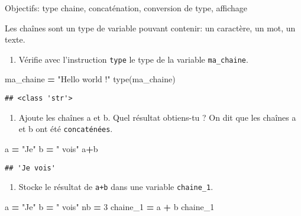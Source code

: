 \documentclass[
]{book}
\newenvironment{Shaded}{\begin{snugshade}}{\end{snugshade}}
\newcommand{\BuiltInTok}[1]{#1}
\newcommand{\DecValTok}[1]{\textcolor[rgb]{0.00,0.00,0.81}{#1}}
\newcommand{\NormalTok}[1]{#1}
\newcommand{\OperatorTok}[1]{\textcolor[rgb]{0.81,0.36,0.00}{\textbf{#1}}}
\newcommand{\StringTok}[1]{\textcolor[rgb]{0.31,0.60,0.02}{#1}}
\providecommand{\tightlist}{%
  \setlength{\itemsep}{0pt}\setlength{\parskip}{0pt}}
\def\tightlist{}
\begin{document}
Objectifs: type chaine, concaténation, conversion de type, affichage

Les chaînes sont un type de variable pouvant contenir: un caractère, un mot, un texte.

\begin{enumerate}
\def\labelenumi{\arabic{enumi}.}
\tightlist
\item
  Vérifie avec l'instruction \texttt{type} le type de la variable \texttt{ma\_chaine}.
\end{enumerate}

\begin{Shaded}
\begin{Highlighting}[]
\NormalTok{ma\_chaine }\OperatorTok{=} \StringTok{"Hello world !"}
\BuiltInTok{type}\NormalTok{(ma\_chaine)}
\end{Highlighting}
\end{Shaded}

\begin{verbatim}
## <class 'str'>
\end{verbatim}

\begin{enumerate}
\def\labelenumi{\arabic{enumi}.}
\setcounter{enumi}{1}
\tightlist
\item
  Ajoute les chaînes a et b. Quel résultat obtiens-tu ? On dit que les chaînes a et b ont été \texttt{concaténées}.
\end{enumerate}

\begin{Shaded}
\begin{Highlighting}[]
\NormalTok{a }\OperatorTok{=} \StringTok{"Je"}
\NormalTok{b }\OperatorTok{=} \StringTok{" vois"}
\NormalTok{a}\OperatorTok{+}\NormalTok{b}
\end{Highlighting}
\end{Shaded}

\begin{verbatim}
## 'Je vois'
\end{verbatim}

\begin{enumerate}
\def\labelenumi{\arabic{enumi}.}
\setcounter{enumi}{2}
\tightlist
\item
  Stocke le résultat de \texttt{a+b} dans une variable \texttt{chaine\_1}.
\end{enumerate}

\begin{Shaded}
\begin{Highlighting}[]
\NormalTok{a }\OperatorTok{=} \StringTok{"Je"}
\NormalTok{b }\OperatorTok{=} \StringTok{" vois"}
\NormalTok{nb }\OperatorTok{=} \DecValTok{3}
\NormalTok{chaine\_1 }\OperatorTok{=}\NormalTok{ a }\OperatorTok{+}\NormalTok{ b}
\NormalTok{chaine\_1}
\end{Highlighting}
\end{Shaded}
\end{document}
